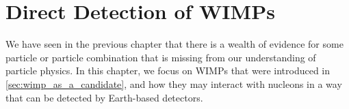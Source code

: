 \chapter{Direct Detection of WIMPs}
\label{chap:detection_theory}
\par
We have seen in the previous chapter that there is a wealth of evidence for some particle or particle combination that is missing from our understanding of particle physics.
In this chapter, we focus on WIMPs that were introduced in \autoref{sec:wimp_as_a_candidate}, and how they may interact with nucleons in a way that can be detected by Earth-based detectors.





